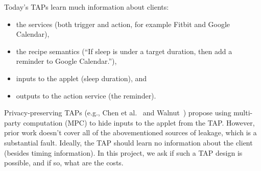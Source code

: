 Today's TAPs learn much information about clients:
\begin{itemize}[leftmargin=*]
  \item the services (both trigger and action, for example Fitbit and Google Calendar),
  \item the recipe semantics (``If sleep is under a target duration, then add a
    reminder to Google Calendar.''),
  \item inputs to the applet (sleep duration), and
  \item outputs to the action service (the reminder).
\end{itemize}


Privacy-preserving TAPs (e.g., Chen et al.~\cite{DBLP:conf/sp/ChenCWSCF21} and 
Walnut~\cite{DBLP:journals/corr/abs-2009-12447}) propose using multi-party computation (MPC) to hide
inputs to the applet from the TAP. However, prior work doesn't cover all of the abovementioned 
sources of leakage, which is a substantial fault. Ideally, the TAP should learn no information about the
client (besides timing information). In this project, we ask if such a TAP design is possible, and if
so, what are the costs. 
